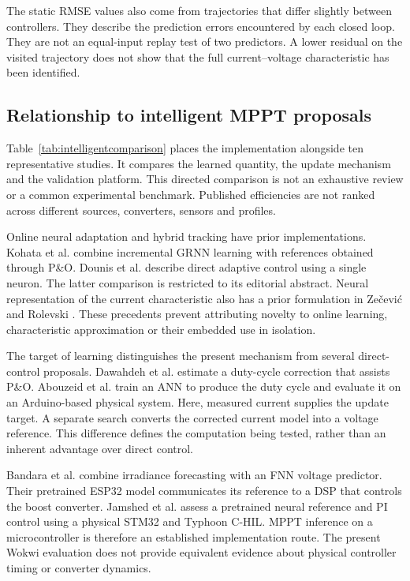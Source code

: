 \documentclass[Acad.Energy.,researcharticle,9pt,twoside,oneauthor]{Definitions/jams_academia}
\begin{document}
The static RMSE values also come from trajectories that differ slightly between controllers. They describe the prediction errors encountered by each closed loop. They are not an equal-input replay test of two predictors. A lower residual on the visited trajectory does not show that the full current--voltage characteristic has been identified.

\subsection{Relationship to intelligent MPPT proposals}
Table~\ref{tab:intelligentcomparison} places the implementation alongside ten representative studies. It compares the learned quantity, the update mechanism and the validation platform. This directed comparison is not an exhaustive review or a common experimental benchmark. Published efficiencies are not ranked across different sources, converters, sensors and profiles.

Online neural adaptation and hybrid tracking have prior implementations. Kohata et al. \cite{kohata2010} combine incremental GRNN learning with references obtained through P\&O. Dounis et al. \cite{dounis2015} describe direct adaptive control using a single neuron. The latter comparison is restricted to its editorial abstract. Neural representation of the current characteristic also has a prior formulation in Ze\v{c}evi\'c and Rolevski \cite{nnmodel}. These precedents prevent attributing novelty to online learning, characteristic approximation or their embedded use in isolation.

The target of learning distinguishes the present mechanism from several direct-control proposals. Dawahdeh et al. \cite{hybrid2024} estimate a duty-cycle correction that assists P\&O. Abouzeid et al. \cite{abouzeid} train an ANN to produce the duty cycle and evaluate it on an Arduino-based physical system. Here, measured current supplies the update target. A separate search converts the corrected current model into a voltage reference. This difference defines the computation being tested, rather than an inherent advantage over direct control.

Bandara et al. \cite{bandara2024} combine irradiance forecasting with an FNN voltage predictor. Their pretrained ESP32 model communicates its reference to a DSP that controls the boost converter. Jamshed et al. \cite{jamshed} assess a pretrained neural reference and PI control using a physical STM32 and Typhoon C-HIL. MPPT inference on a microcontroller is therefore an established implementation route. The present Wokwi evaluation does not provide equivalent evidence about physical controller timing or converter dynamics.
\end{document}
